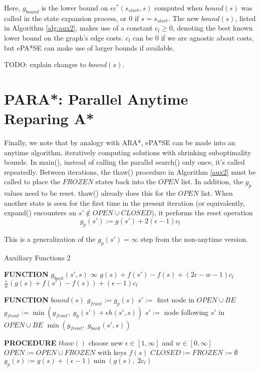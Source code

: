 \documentclass[letterpaper]{article}
\begin{document}
Here, $g_{bound}$ is the lower bound on $\epsilon c^*(s_{start},s)$ computed when $bound(s)$ was called in the state expansion process, or $0$ if $s=s_{start}$. The new $bound(s)$, listed in Algorithm \ref{alg:aux2}, makes use of a constant $c_l \ge 0$, denoting the best known lower bound on the graph's edge costs. $c_l$ can be 0 if we are agnostic about costs, but ePA*SE can make use of larger bounds if available.

TODO: explain changes to $bound(s)$.

\section{PARA*: Parallel Anytime Reparing A*}

Finally, we note that by analogy with ARA*, ePA*SE can be made into an anytime algorithm, iteratively computing solutions with shrinking suboptimality bounds. In main(), instead of calling the parallel search() only once, it's called repeatedly. Between iterations, the thaw() procedure in Algorithm \ref{aux2} must be called to place the $FROZEN$ states back into the $OPEN$ list. In addition, the $g_p$ values need to be reset. thaw() already does this for the $OPEN$ list. When another state is seen for the first time in the present iteration (or equivalently, expand() encounters an $s'\notin OPEN\cup CLOSED$), it performs the reset operation
\[g_p(s') := g(s') + 2(\epsilon-1)c_l\]

This is a generalization of the $g_p(s') = \infty$ step from the non-anytime version.

\begin{algorithm}
\caption{Auxiliary Functions 2}
\label{alg:aux2}
\begin{algorithmic}
\STATE \textbf{FUNCTION} $g_{back}(s',s)$
\RETURN $\infty$
\RETURN $g(s) + f(s') - f(s) + (2\epsilon-w-1)c_l$
\ELSE
\RETURN $\frac\epsilon w\left(g(s) + f(s') - f(s)\right) + (\epsilon-1)c_l$
\ENDIF

\STATE \textbf{FUNCTION} $bound(s)$
\STATE $g_{front} := g_p(s)$
\STATE $s' :=$ first node in $OPEN \cup BE$
\STATE $g_{front} := \min(g_{front},\;g_p(s') + \epsilon h(s',s))$
\STATE $s' :=$ node following $s'$ in $OPEN \cup BE$
\ENDWHILE
\RETURN $\min(g_{front},\;g_{back}(s',s))$

\STATE \textbf{PROCEDURE} $thaw()$
\STATE choose new $\epsilon \in [1,\infty]$ and $w \in [0,\infty]$
\STATE $OPEN := OPEN \cup FROZEN$ with keys $f(s)$
\STATE $CLOSED := FROZEN := \emptyset$
\STATE $g_p(s) := g(s) + (\epsilon-1)\min(g(s),\;2c_l)$
\ENDFOR
\end{algorithmic}
\end{algorithm}
\end{document}
